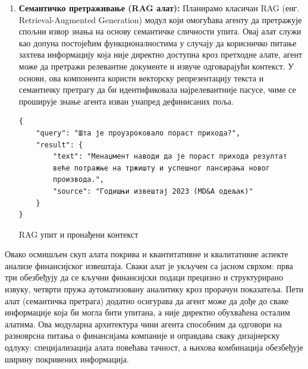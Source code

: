 \begin{enumerate}
    \begin{center}
    \begin{listing}[!ht]
    \begin{verbatim}
{
    "ROA": 0.19,
    "ROE": 0.67,
    "debt_to_equity": 2.5,
    "current_ratio": 1.2
}
    \end{verbatim}
    \caption{Пример израчунатих KPI показатеља}\label{lst:kpi_json}
    \end{listing}
    \end{center}

    \item \textbf{Семантичко претраживање (RAG алат):} Планирамо класичан RAG (енг. Retrieval-Augmented Generation) модул који омогућава агенту да претражује спољни извор знања на основу семантичке сличности упита. Овај алат служи као допуна постојећим функционалностима у случају да корисничко питање захтева информацију која није директно доступна кроз претходне алате, агент може да претражи релевантне документе и извуче одговарајући контекст. У основи, ова компонента користи векторску репрезентацију текста и семантичку претрагу да би идентификовала најрелевантније пасусе, чиме се проширује знање агента изван унапред дефинисаних поља.

    \begin{center}
    \begin{listing}[!ht]
    \begin{verbatim}
{
    "query": "Шта је проузроковало пораст прихода?",
    "result": {
        "text": "Менаџмент наводи да је пораст прихода резултат 
        веће потражње на тржишту и успешног лансирања новог 
        производа.",
        "source": "Годишњи извештај 2023 (MD&A одељак)"
    }
}
    \end{verbatim}
    \caption{RAG упит и пронађени контекст}\label{lst:rag_json}
    \end{listing}
    \end{center}
\end{enumerate}

Овако осмишљен скуп алата покрива и квантитативне и квалитативне аспекте анализе финансијског извештаја. Сваки алат је укључен са јасном сврхом: прва три обезбеђују да се кључни финансијски подаци прецизно и структурирано извуку, четврти пружа аутоматизовану аналитику кроз прорачун показатеља. Пети алат (семантичка претрага) додатно осигурава да агент може да дође до сваке информације која би могла бити упитана, а није директно обухваћена осталим алатима. Ова модуларна архитектура чини агента способним да одговори на разноврсна питања о финансијама компаније и оправдава сваку дизајнерску одлуку: специјализација алата повећава тачност, а њихова комбинација обезбеђује ширину покривених информација.

